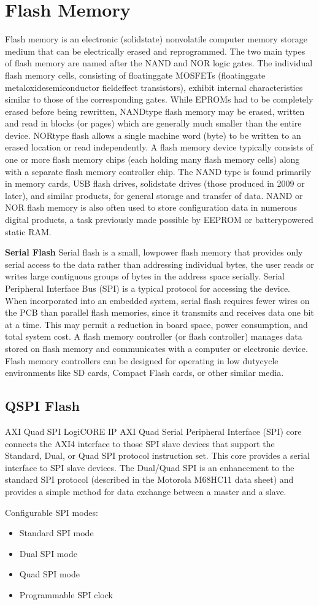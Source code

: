 \section{Flash Memory} 
Flash memory is an electronic (solid\textendash state) non\textendash volatile computer memory storage medium that can be electrically erased and reprogrammed. The two main types of flash memory are named after the NAND and NOR logic gates. The individual flash memory cells, consisting of floating\textendash gate MOSFETs (floating\textendash gate metal\textendash oxide\textendash semiconductor field\textendash effect transistors), exhibit internal characteristics similar to those of the corresponding gates. While EPROMs had to be completely erased before being rewritten, NAND\textendash type flash memory may be erased, written and read in blocks (or pages) which are generally much smaller than the entire device. NOR\textendash type flash allows a single machine word (byte) to be written to an erased location or read independently. A flash memory device typically consists of one or more flash memory chips (each holding many flash memory cells) along with a separate flash memory controller chip. The NAND type is found primarily in memory cards, USB flash drives, solid\textendash state drives (those produced in 2009 or later), and similar products, for general storage and transfer of data. NAND or NOR flash memory is also often used to store configuration data in numerous digital products, a task previously made possible by EEPROM or battery\textendash powered static RAM. 

\textbf{Serial Flash} Serial flash is a small, low\textendash power flash memory that provides only serial access to the data \textendash  rather than addressing individual bytes, the user reads or writes large contiguous groups of bytes in the address space serially. Serial Peripheral Interface Bus (SPI) is a typical protocol for accessing the device. When incorporated into an embedded system, serial flash requires fewer wires on the PCB than parallel flash memories, since it transmits and receives data one bit at a time. This may permit a reduction in board space, power consumption, and total system cost. A flash memory controller (or flash controller) manages data stored on flash memory and communicates with a computer or electronic device. Flash memory controllers can be designed for operating in low duty\textendash cycle environments like SD cards, Compact Flash cards, or other similar media.

\subsection{QSPI Flash}
AXI Quad SPI LogiCORE IP AXI Quad Serial Peripheral Interface (SPI) core connects the AXI4 interface to those SPI slave devices that support the Standard, Dual, or Quad SPI protocol instruction set. This core provides a serial interface to SPI slave devices. The Dual/Quad SPI is an enhancement to the standard SPI protocol (described in the Motorola M68HC11 data sheet) and provides a simple method for data exchange between a master and a slave.

Configurable SPI modes:
\begin{itemize}
  \item Standard SPI mode
  \item Dual SPI mode
  \item Quad SPI mode
  \item Programmable SPI clock 
\end{itemize} 
